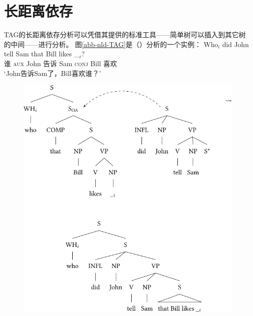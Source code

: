 \section{长距离依存}
\label{TAG-Fernabh}

TAG的长距离依存分析可以凭借其提供的标准工具——简单树可以插入到其它树的中间——进行分析。
图\vref{abb-nld-TAG}是（）分析的一个实例：
\ea
\gll Who$_i$ did John tell Sam that Bill likes \_$_i$?\\
     谁 \textsc{aux} John 告诉 Sam \textsc{conj} Bill 喜欢 \\
\glt `John告诉Sam了，Bill喜欢谁？'
\z
%
\begin{figure}
\includegraphics{Figures/tag-long-distance-dependencies-crop}

\end{figure}
